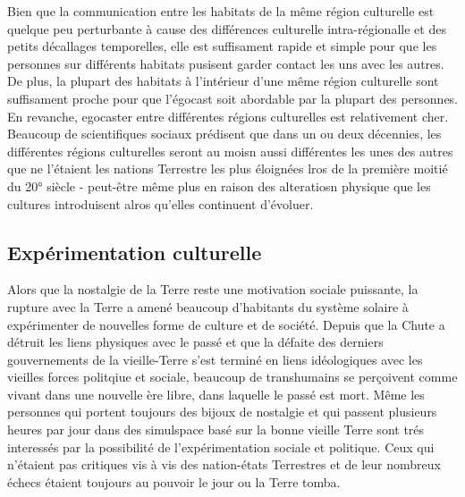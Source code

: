       Bien que la communication entre les habitats de la même région culturelle est quelque peu perturbante à cause des différences culturelle intra-régionalle et des petits décallages temporelles, elle est suffisament rapide et simple pour que les personnes sur différents habitats pusisent garder contact les uns avec les autres. De plus, la plupart des habitats à l'intérieur d'une même région culturelle sont suffisament proche pour que l'égocast soit abordable par la plupart des personnes. En revanche, egocaster entre différentes régions culturelles est relativement cher. Beaucoup de scientifiques sociaux prédisent que dans un ou deux décennies, les différentes régions culturelles seront au moisn aussi différentes les unes des autres que ne l'étaient les nations Terrestre les plus éloignées lros de la première moitié du 20° siècle - peut-être même plus en raison des alteratiosn physique que les cultures introduisent alros qu'elles continuent d'évoluer. 

      \subsection{Expérimentation culturelle} \label{sec:cult-exper} 

      Alors que la nostalgie de la Terre reste une motivation sociale puissante, la rupture avec la Terre a amené beaucoup d'habitants du système solaire à expérimenter de nouvelles forme de culture et de société. Depuis que la Chute a détruit les liens physiques avec le passé et que la défaite des derniers gouvernements de la vieille-Terre s'est terminé en liens idéologiques avec les vieilles forces politqiue et sociale, beaucoup de transhumains se perçoivent comme vivant dans une nouvelle ère libre, dans laquelle le passé est mort. Même les personnes qui portent toujours des bijoux de nostalgie et qui passent plusieurs heures par jour dans des simulspace basé sur la bonne vieille Terre sont trés interessés par la possibilité de l'expérimentation sociale et politique. Ceux qui n'étaient pas critiques vis à vis des nation-états Terrestres et de leur nombreux échecs étaient toujours au pouvoir le jour ou la Terre tomba. 

